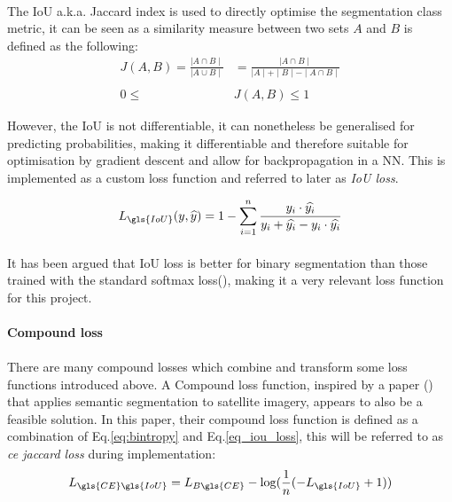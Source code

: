 \paragraph{}
The \gls{IoU} \gls{a.k.a.} Jaccard index is used to directly optimise the segmentation class metric, it can be seen as a similarity measure between two sets $A$ and $B$ is defined as the following:
\begin{equation}
\label{eq_jaccard}
\begin{aligned}
J(A, B) = \frac{\mid A \cap B \mid }{\mid A \cup B \mid} &= \frac{\mid A \cap B \mid}{\mid A \mid + \mid B \mid - \mid A \cap B \mid} \\ \\
0 \le & J(A, B) \le 1
\end{aligned}
\end{equation}

However, the \gls{IoU} is not differentiable, it can nonetheless be generalised for predicting probabilities, making it differentiable and therefore suitable for optimisation by gradient descent and allow for backpropagation in a \gls{NN}. This is implemented as a custom loss function and referred to later as \textit{\gls{IoU} loss}.

\begin{equation} \label{eq_iou_loss}
L_{\gls{IoU}}(y, \widehat{y}) = 1- \sum_{i=1}^n \frac{y_i \cdot \widehat{y_i}}{y_i + \widehat{y_i} - y_i \cdot \widehat{y_i}}
\end{equation}

\paragraph{}

It has been argued that \gls{IoU} loss is better for binary segmentation than those trained with the standard softmax loss(\cite{Rahman_2016}), making it a very relevant loss function for this project.

\paragraph{Compound loss}
\paragraph{}
There are many compound losses which combine and transform some loss functions introduced above. A Compound loss function, inspired by a paper (\cite{DBLP:journals/corr/IglovikovMO17}) that applies semantic segmentation to satellite imagery, appears to also be a feasible solution.
In this paper, their compound loss function is defined as a combination of Eq.\ref{eq:bintropy} and Eq.\ref{eq_iou_loss}, this will be referred to as \textit{ce jaccard loss} during implementation:
\begin{equation}
L_{\gls{CE} \gls{IoU}} = L_{B\gls{CE}} - \log (\frac{1}{n} (-L_{\gls{IoU}}+1))
\end{equation}

